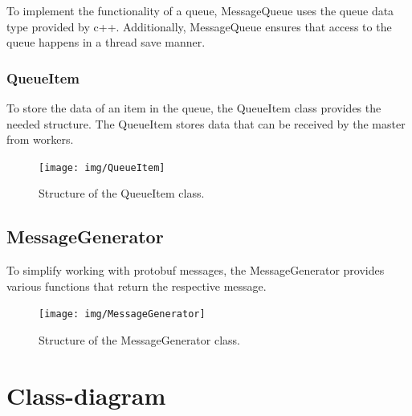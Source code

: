 \documentclass[12pt, letterpaper]{article}
\begin{document}
To implement the functionality of a queue, MessageQueue uses the queue data type provided by c++. Additionally, MessageQueue ensures that access to the queue happens in a thread save manner. 

\subsubsection{QueueItem}

To store the data of an item in the queue, the QueueItem class provides the needed structure. 
The QueueItem stores data that can be received by the master from workers.

\begin{figure}[h]
	\centering
	\texttt{[image: img/QueueItem]}
	\caption{Structure of the QueueItem class.}
	\label{fig:classes_QueueItem}
\end{figure}

\subsection{MessageGenerator}

To simplify working with protobuf messages, the MessageGenerator provides various functions that return the respective message. 

\begin{figure}[h]
	\centering
	\texttt{[image: img/MessageGenerator]}
	\caption{Structure of the MessageGenerator class.}
	\label{fig:classes_MessageGenerator}
\end{figure}

\pagebreak
\section{Class-diagram}
\end{document}
